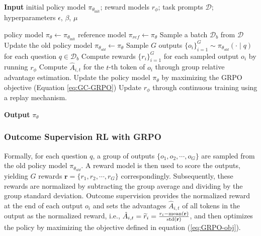 \begin{algorithm}[t]
  \small
  \caption{Iterative Group Relative Policy Optimization}
  \textbf{Input} initial policy model $\pi_{\theta_{\text{init}}}$; reward models $r_\phi$; task prompts $\mathcal{D}$; 
  hyperparameters $\epsilon$, $\beta$, $\mu$
  \begin{algorithmic}[1]
    \State policy model $\pi_\theta \leftarrow \pi_{\theta_{\text{init}}}$
       \State reference model $\pi_{ref} \leftarrow \pi_{\theta}$
      \State Sample a batch $\mathcal{D}_b$ from $\mathcal{D}$
      \State Update the old policy model $\pi_{\theta_{old}} \leftarrow \pi_{\theta}$ 
      \State Sample $G$ outputs $\{o_i\}_{i=1}^G \sim \pi_{\theta_{old}} (\cdot \mid q) $ for each question $q \in \mathcal{D}_b$
      \State Compute rewards $\{r_i\}_{i=1}^{G}$ for each sampled output $o_i$ by running $r_{\phi}$ 
      \State Compute $\hat{A}_{i,t}$ for the $t$-th token of $o_i$ through group relative advantage estimation.
        \State Update the policy model $\pi_{\theta}$ by maximizing the GRPO objective (Equation \ref{eq:GC-GRPO})
      \EndFor
    \EndFor 
    \State Update $r_\phi$ through continuous training using a replay mechanism. 
    \EndFor 
  \end{algorithmic}
  \textbf{Output} $\pi_\theta$
  \label{alg:iter-grpo}
\end{algorithm}
\subsubsection{Outcome Supervision RL with GRPO} 
Formally, for each question $q$,  a group of outputs $\{o_1, o_2, \cdots, o_G\}$  are sampled from the old policy model $\pi_{\theta_{old}}$. A reward model is then used to score the outputs, yielding $G$ rewards  $\mathbf{r}=\{r_1, r_2, \cdots, r_G\}$ correspondingly. Subsequently, these rewards are normalized by subtracting the group average and dividing by the group standard deviation. Outcome supervision provides the normalized reward at the end of each output $o_i$  and sets the advantages  $\hat{A}_{i, t}$  of all tokens in the output as the normalized reward, i.e., $\hat{A}_{i, t} = \widetilde{r}_i = \frac{r_i- {\rm mean}(\mathbf{r})}{{\rm std}(\mathbf{r})}$, and then optimizes the policy by maximizing the objective defined in equation (\ref{eq:GRPO-obj}).

